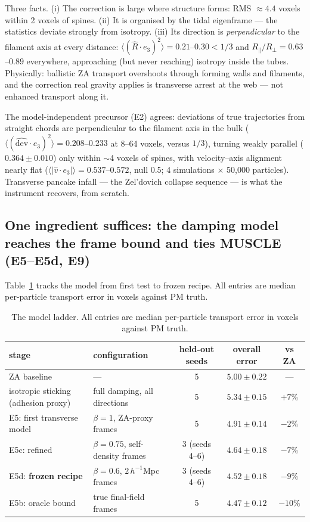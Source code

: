 \documentclass[11pt]{article}
\begin{document}
Three facts. (i) The correction is large where structure forms: RMS $\approx 4.4$ voxels within 2 voxels of spines. (ii) It is organised by the tidal eigenframe --- the statistics deviate strongly from isotropy. (iii) Its direction is \emph{perpendicular} to the filament axis at every distance: $\langle(\hat{R}\cdot e_3)^2\rangle = 0.21$--$0.30 < 1/3$ and $R_\parallel/R_\perp = 0.63$--$0.89$ everywhere, approaching (but never reaching) isotropy inside the tubes. Physically: ballistic ZA transport overshoots through forming walls and filaments, and the correction real gravity applies is transverse arrest at the web --- not enhanced transport along it.

The model-independent precursor (E2) agrees: deviations of true trajectories from straight chords are perpendicular to the filament axis in the bulk ($\langle(\widehat{\mathrm{dev}}\cdot e_3)^2\rangle = 0.208$--$0.233$ at 8--64 voxels, versus $1/3$), turning weakly parallel ($0.364 \pm 0.010$) only within $\sim$4 voxels of spines, with velocity--axis alignment nearly flat ($\langle|\hat{v}\cdot e_3|\rangle = 0.537$--$0.572$, null 0.5; 4 simulations $\times$ 50,000 particles). Transverse pancake infall --- the Zel'dovich collapse sequence --- is what the instrument recovers, from scratch.

\subsection{One ingredient suffices: the damping model reaches the frame bound and ties MUSCLE (E5--E5d, E9)}
\label{sec:sufficiency}

Table~\ref{tab:ladder} tracks the model from first test to frozen recipe. All entries are median per-particle transport error in voxels against PM truth.

\begin{table}[htbp]
\centering
\caption{The model ladder. All entries are median per-particle transport error in voxels against PM truth.}
\label{tab:ladder}
\small
\begin{tabular}{llccc}
\toprule
stage & configuration & held-out seeds & overall error & vs ZA \\
\midrule
ZA baseline & --- & 5 & $5.00 \pm 0.22$ & --- \\
isotropic sticking (adhesion proxy) & full damping, all directions & 5 & $5.34 \pm 0.15$ & $+7\%$ \\
E5: first transverse model & $\beta = 1$, ZA-proxy frames & 5 & $4.91 \pm 0.14$ & $-2\%$ \\
E5c: refined & $\beta = 0.75$, self-density frames & 3 (seeds 4--6) & $4.64 \pm 0.18$ & $-7\%$ \\
E5d: \textbf{frozen recipe} & $\beta = 0.6$, $2\,h^{-1}$Mpc frames & 3 (seeds 4--6) & {\boldmath$4.52 \pm 0.18$} & {\boldmath$-9\%$} \\
E5b: oracle bound & true final-field frames & 5 & $4.47 \pm 0.12$ & $-10\%$ \\
\bottomrule
\end{tabular}
\end{table}
\end{document}

